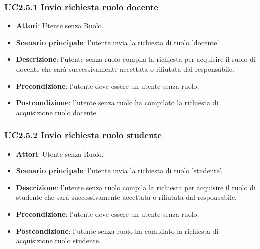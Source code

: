 \subsubsection{UC2.5.1 Invio richiesta ruolo docente}
\begin{itemize}
\item \textbf{Attori}: Utente senza Ruolo.
\item \textbf{Scenario principale}: l'utente invia la richiesta di ruolo 'docente'.
\item \textbf{Descrizione}: l'utente senza ruolo compila la richiesta per acquisire il ruolo di docente che sarà successivamente accettata  o rifiutata dal responsabile.
\item \textbf{Precondizione}: l'utente deve essere un utente senza ruolo.
\item \textbf{Postcondizione}: l'utente senza ruolo ha compilato la richiesta di acquisizione ruolo docente.
\end{itemize}
\subsubsection{UC2.5.2 Invio richiesta ruolo studente}
\begin{itemize}
\item \textbf{Attori}: Utente senza Ruolo.
\item \textbf{Scenario principale}: l'utente invia la richiesta di ruolo 'studente'.
\item \textbf{Descrizione}: l'utente senza ruolo compila la richiesta per acquisire il ruolo di studente che sarà successivamente accettata o rifiutata dal responsabile.
\item \textbf{Precondizione}: l'utente deve essere un utente senza ruolo.
\item \textbf{Postcondizione}: l'utente senza ruolo ha compilato la richiesta di acquisizione ruolo studente.
\end{itemize}
